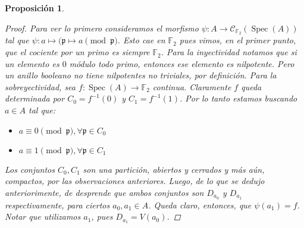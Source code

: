 \documentclass[11pt,a4paper, spanish,oneside,fleqn]{article}
\newtheorem{prop}[teo]{Proposición}
\theoremstyle{definition}
\newcommand{\FF}{\mathbb{F}}
\DeclareMathOperator{\spec}{Spec}
\begin{document}
\begin{prop}
\begin{proof}
Para ver lo primero consideramos el morfismo $\psi : A \to \mathscr{C}_{\FF_2}(\spec(A))$ tal que
$\psi : a\mapsto (\mathfrak{p}\mapsto a \pmod{\mathfrak{p}}$. Esto cae en $\FF_2$ pues vimos, en el primer punto, 
que el cociente por un primo es siempre $\FF_2$.
Para la inyectividad notamos que si un elemento es $0$ m\'odulo todo primo, entonces ese elemento es nilpotente.
Pero un anillo booleano no tiene nilpotentes no triviales, por definici\'on.
Para la sobreyectividad, sea $f : \spec(A) \to \FF_2$ continua. Claramente $f$ queda determinada por $C_0 = f^{-1}(0)$ y $C_1 = f^{-1}(1)$.
Por lo tanto estamos buscando $a\in A$ tal que:
\begin{itemize}
  \item $a\equiv 0 \pmod{\mathfrak{p}}, \forall \mathfrak{p} \in C_0$
  \item $a\equiv 1 \pmod{\mathfrak{p}}, \forall \mathfrak{p} \in C_1$
\end{itemize}
Los conjuntos $C_0,C_1$ son una partici\'on, abiertos y cerrados y m\'as a\'un, compactos, por las observaciones anteriores.
Luego, de lo que se dedujo anteriorimente, de desprende que ambos conjuntos son $D_{a_0}$ y $D_{a_1}$ respectivamente,
para ciertos $a_0,a_1\in A$.
Queda claro, entonces, que $\psi(a_1) = f$. Notar que utilizamos $a_1$, pues $D_{a_1} = V(a_0)$.


\end{proof}
\end{prop}
\end{document}
